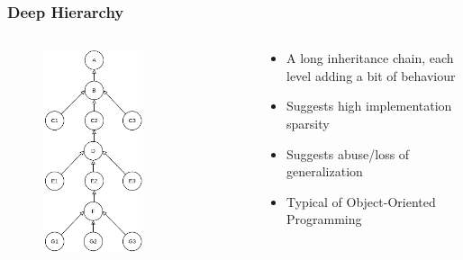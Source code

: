 \documentclass[dvipsnames, 10pt, table]{beamer}
\begin{document}
\begin{frame}
  \frametitle{Deep Hierarchy}
  \begin{columns}
    \begin{column}{0.5\textwidth}
      \begin{figure}
        \begin{center}
          \includegraphics[width=0.6\textwidth]{figures/architectural-smells/deep-hierarchy.png}
        \end{center}
      \end{figure}
    \end{column}
    \begin{column}{0.5\textwidth}
      \begin{itemize}
        \item A long inheritance chain, each level adding a bit of behaviour
        \item Suggests high implementation sparsity
        \item Suggests abuse/loss of generalization
        \item Typical of Object-Oriented Programming
      \end{itemize}
    \end{column}
  \end{columns}
\end{frame}
\end{document}
